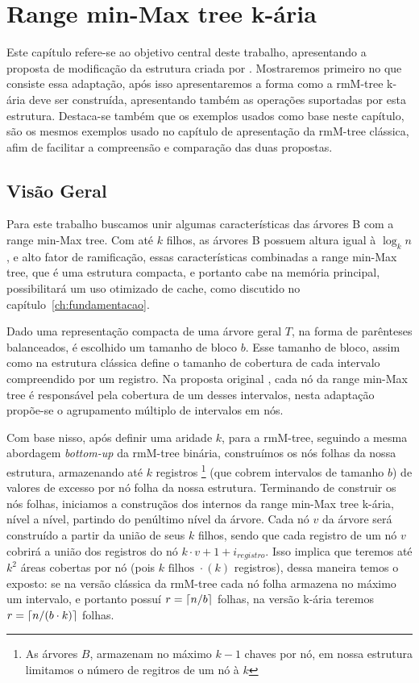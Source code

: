 \chapter{Range min-Max tree k-ária}
\label{chp:desenvolvimento}
Este capítulo refere-se ao objetivo central deste trabalho, apresentando a proposta de modificação da estrutura criada por \cite{paper-fully-functinal-succint-trees}. Mostraremos primeiro no que consiste essa adaptação, após isso apresentaremos a forma como a rmM-tree k-ária deve ser construída, apresentando também as operações suportadas por esta estrutura. 
Destaca-se também que os exemplos usados como base neste capítulo, são os mesmos exemplos usado no capítulo de apresentação da rmM-tree clássica, afim de facilitar a compreensão e comparação das duas propostas.

\section{Visão Geral}
Para este trabalho buscamos unir algumas características das árvores B com a range min-Max tree. Com até $k$ filhos, as árvores B possuem altura igual à $\log_k n$, e alto fator de ramificação, essas características combinadas a range min-Max tree, que é uma estrutura compacta, e portanto cabe na memória principal, possibilitará um uso otimizado de cache, como discutido no capítulo~\ref{ch:fundamentacao}.

Dado uma representação compacta de uma árvore geral $T$, na forma de parênteses balanceados, é escolhido um tamanho de bloco $b$. Esse tamanho de bloco, assim como na estrutura clássica define o tamanho de cobertura de cada intervalo compreendido por um registro.  Na proposta original \citet{paper-fully-functinal-succint-trees}, cada nó da range min-Max tree é responsável pela cobertura de um desses intervalos, nesta adaptação propõe-se o agrupamento múltiplo de intervalos em nós.

Com base nisso, após definir uma aridade $k$, para a rmM-tree, seguindo a mesma abordagem \textit{bottom-up} da rmM-tree binária, construímos os nós folhas da nossa estrutura, armazenando até $k$ registros  \footnote{As árvores $B$, armazenam no máximo $k-1$ chaves por nó, em nossa estrutura limitamos o número de regitros de um nó à $k$} (que cobrem intervalos de tamanho $b$) de valores de excesso por nó folha da nossa estrutura. Terminando de construir os nós folhas, iniciamos a construçãos dos internos da range min-Max tree k-ária, nível a nível, partindo do penúltimo nível da árvore. Cada nó $v$ da árvore será construído a partir da união de seus $k$ filhos, sendo que cada registro de um nó $v$ cobrirá a união dos registros do nó $k \cdot v +1 + i_{registro}$. 
Isso implica que teremos até  $k^2$  áreas cobertas por nó  (pois $k \mbox{ filhos } \cdot (k) $ registros), dessa maneira temos o exposto: se na versão clássica  da rmM-tree cada nó folha armazena no máximo um intervalo, e portanto possuí $r=\lceil n/b\rceil$ folhas, 
na versão k-ária teremos $r=\lceil n/(b \cdot k)\rceil$ folhas.

